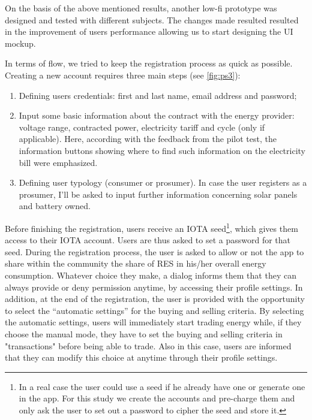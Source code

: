 On the basis of the above mentioned results, another low-fi prototype was designed and tested with different subjects. The changes made resulted resulted in the improvement of users performance allowing us to start designing the \ac{UI} mockup.

In terms of flow, we tried to keep the registration process as quick as possible. Creating a new account requires three main steps (see \cref{fig:ps3}):
\begin{enumerate}
    \item Defining users credentials: first and last name, email address and password;
    \item Input some basic information about the contract with the energy provider: voltage range, contracted power, electricity tariff and cycle (only if applicable). Here, according with the feedback from the pilot test, the information buttons showing where to find such information on the electricity bill were emphasized.
    \item Defining user typology (consumer or prosumer). In case the user registers as a prosumer, I’ll be asked to input further information concerning solar panels and battery owned.
\end{enumerate}


Before finishing the registration, users receive an IOTA seed\footnote{In a real case the user could use a seed if he already have one or generate one in the app. For this study we create the accounts and pre-charge them and only ask the user to set out a password to cipher the seed and store it.}, which gives them access to their IOTA account. Users are thus asked to set a password for that seed.
During the registration process, the user is asked to allow or not the app to share within the community the share of RES in his/her overall energy consumption. Whatever choice they make, a dialog informs them that they can always provide or deny permission anytime, by accessing their profile settings. In addition, at the end of the registration, the user is provided with the opportunity to select the “automatic settings” for the buying and selling criteria. By selecting the automatic settings, users will immediately start trading energy while, if they choose the manual mode, they have to set the buying and selling criteria in "transactions" before being able to trade. Also in this case, users are informed that they can modify this choice at anytime through their profile settings.

